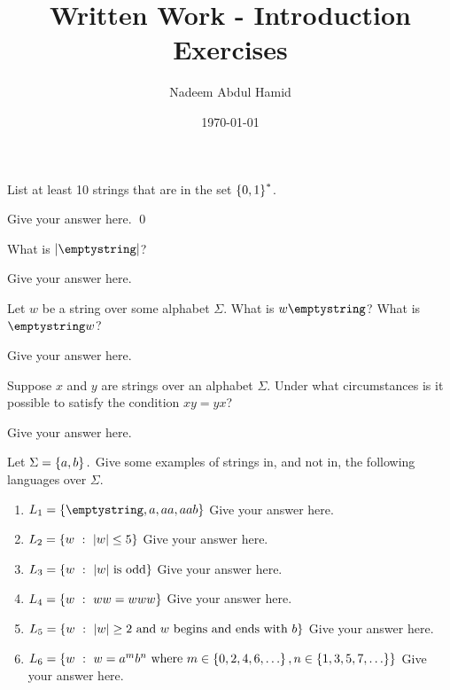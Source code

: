 \documentclass[10pt]{article}
\title{Written Work - Introduction Exercises} 	%
\author{Nadeem Abdul Hamid}      			%
\date{\today}							%
\begin{document}
\maketitle

\begin{exersoln}{5}   %
	List at least 10 strings that are in the set $\left\lbrace 0, 1 \right\rbrace^{*}$.
	
	\answer    %
	Give your answer here.
	\qed		%
\end{exersoln}

\begin{exersoln}{7}
	What is $|\emptystring|$?
	
	\answer
	Give your answer here.
\end{exersoln}

\begin{exersoln}{10}
	Let $w$ be a string over some alphabet $\Sigma$. What is $w\emptystring$? What is $\emptystring w$?
	
	\answer
	Give your answer here.
\end{exersoln}

\begin{exersoln}{11}
	Suppose $x$ and $y$ are strings over an alphabet $\Sigma$. Under what circumstances is it possible to satisfy the condition $xy = yx$? 
	
	\answer
	Give your answer here.
\end{exersoln}

\begin{exersoln}{13}
	Let $\Sigma = \left\lbrace a, b \right\rbrace.$ Give some examples of strings in, and not in, the following languages over $\Sigma$.
	\begin{enumerate}[label=(\alph*)]
	\item $L_1 = \setdef{ \emptystring, a, aa, aab }$
		\answer
		Give your answer here.
	\item $L_2 = \left\lbrace w\ :\ |w| \leq 5 \right\rbrace$
		\answer
		Give your answer here.
	\item $L_3 = \left\lbrace w\ :\ |w|~\textrm{is odd} \right\rbrace$
		\answer
		Give your answer here.
	\item $L_4 = \left\lbrace w\ :\ ww = www \right\rbrace$
		\answer
		Give your answer here.
	\item $L_5 = \left\lbrace w\ :\ |w| \geq 2 ~\textrm{and $w$ begins and ends with $b$} \right\rbrace$
		\answer
		Give your answer here.
	\item $L_6 = \left\lbrace w\ :\ w = a^m b^n ~\textrm{where}~ m \in \left\lbrace 0, 2, 4, 6, \ldots \right\rbrace, n \in \left\lbrace 1, 3, 5, 7, \ldots \right\rbrace \right\rbrace$
		\answer
		Give your answer here.
	\end{enumerate}
\end{exersoln}
\end{document}
